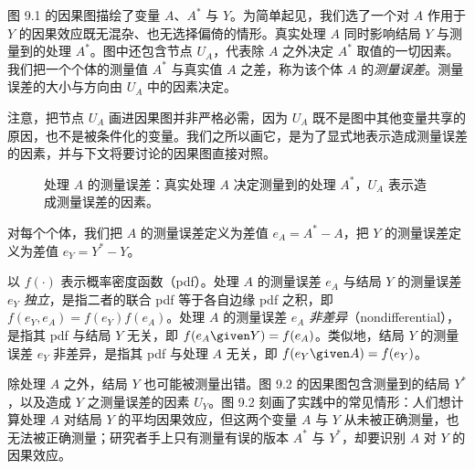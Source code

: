 图 9.1 的因果图描绘了变量 $A$、$A^{*}$ 与 $Y$。为简单起见，我们选了一个对 $A$ 作用于 $Y$ 的因果效应既无混杂、也无选择偏倚的情形。真实处理 $A$ 同时影响结局 $Y$ 与测量到的处理 $A^{*}$。图中还包含节点 $U_A$，代表除 $A$ 之外决定 $A^{*}$ 取值的一切因素。我们把一个个体的测量值 $A^{*}$ 与真实值 $A$ 之差，称为该个体 $A$ 的\emph{测量误差}。测量误差的大小与方向由 $U_A$ 中的因素决定。


注意，把节点 $U_A$ 画进因果图并非严格必需，因为 $U_A$ 既不是图中其他变量共享的原因，也不是被条件化的变量。我们之所以画它，是为了显式地表示造成测量误差的因素，并与下文将要讨论的因果图直接对照。

\begin{figure}[htbp]
\centering
{}
\caption{处理 $A$ 的测量误差：真实处理 $A$ 决定测量到的处理 $A^{*}$，$U_A$ 表示造成测量误差的因素。}
\label{fig:9.1}
\end{figure}

\renewcommand{\TPname}{技术注记（Technical Point）}
\begin{techpoint}[测量误差的独立性与非差异性]
对每个个体，我们把 $A$ 的测量误差定义为差值 $e_A=A^{*}-A$，把 $Y$ 的测量误差定义为差值 $e_Y=Y^{*}-Y$。

以 $f(\cdot)$ 表示概率密度函数（pdf）。处理 $A$ 的测量误差 $e_A$ 与结局 $Y$ 的测量误差 $e_Y$ \emph{独立}，是指二者的联合 pdf 等于各自边缘 pdf 之积，即 $f(e_Y,e_A)=f(e_Y)f(e_A)$。处理 $A$ 的测量误差 $e_A$ \emph{非差异}（nondifferential），是指其 pdf 与结局 $Y$ 无关，即 $f(e_A\given Y)=f(e_A)$。类似地，结局 $Y$ 的测量误差 $e_Y$ 非差异，是指其 pdf 与处理 $A$ 无关，即 $f(e_Y\given A)=f(e_Y)$。
\end{techpoint}
\renewcommand{\TPname}{技术注记}

除处理 $A$ 之外，结局 $Y$ 也可能被测量出错。图 9.2 的因果图包含测量到的结局 $Y^{*}$，以及造成 $Y$ 之测量误差的因素 $U_Y$。图 9.2 刻画了实践中的常见情形：人们想计算处理 $A$ 对结局 $Y$ 的平均因果效应，但这两个变量 $A$ 与 $Y$ 从未被正确测量，也无法被正确测量；研究者手上只有测量有误的版本 $A^{*}$ 与 $Y^{*}$，却要识别 $A$ 对 $Y$ 的因果效应。

